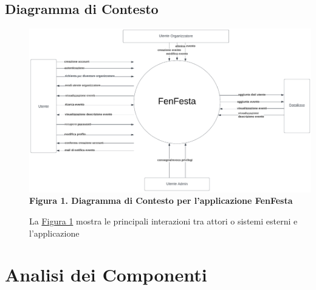 \documentclass{article}
\begin{document}
\subsection{Diagramma di Contesto}
\begin{description}
    \item[] \includegraphics[scale=0.38]{Context.png}
        \textbf{Figura 1. Diagramma di Contesto per l'applicazione FenFesta} \label{fig:1}
    \item[] La \hyperref[fig:1]{Figura 1} mostra le principali interazioni tra attori o sistemi esterni e l'applicazione
\end{description}
\clearpage
\section{Analisi dei Componenti}
\begin{description}
    \item[]
\end{description}
\end{document}
